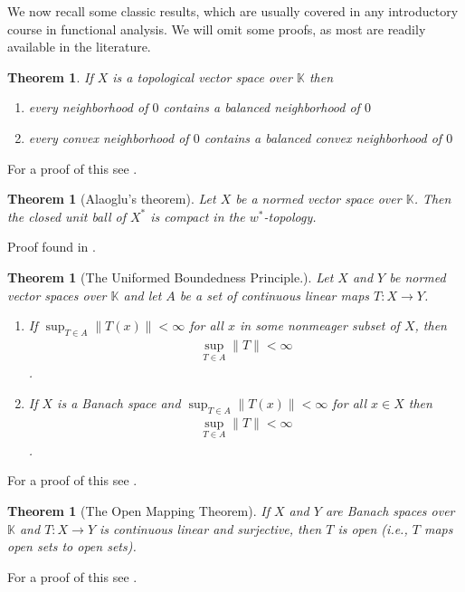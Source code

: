 \documentclass[10pt,twoside,openany,final]{memoir}
\theoremstyle{break}
\newtheorem{theorem}[section]{Theorem}
\theoremstyle{Break}
\newcommand{\lv}{\lVert}
\newcommand{\rv}{\rVert}
\begin{document}
\noindent We now recall some classic results, which are usually covered in any introductory course in functional analysis. We will omit some proofs, as most are readily available in the literature.
\begin{theorem}\label{balanced neigh}
If $X$ is a topological vector space over $\mathbb{K}$ then
\begin{enumerate}
\item every neighborhood of $0$ contains a balanced neighborhood of $0$\\
\item every convex neighborhood of $0$ contains a balanced convex neighborhood of $0$
\end{enumerate}
\end{theorem}
For a proof of this see \cite[1.14][12]{rudin1991functional}.
\begin{theorem}[Alaoglu's theorem]\label{Alaoglu}
	Let $X$ be a normed vector space over $\mathbb{K}$. Then the closed unit ball of $X^*$ is compact in the $w^*$-topology. 
\end{theorem}
\noindent Proof found in \cite[][169]{folland2013real}.

\begin{theorem}[The Uniformed Boundedness Principle.] \label{UBP}
Let $X$ and $Y$ be normed vector spaces over $\mathbb{K}$ and let $A$ be a set of continuous linear maps $T\colon X \to Y$. 
\begin{enumerate}
\item If $\sup_{T \in A} \lv T(x) \rv < \infty$ for all $x$ in some nonmeager subset of $X$, then 
\begin{align*}
\sup_{T \in A} \lv T \rv < \infty
\end{align*}.
\item If $X$ is a Banach space and $\sup_{T \in A} \lv T(x) \rv < \infty$ for all $x \in X$ then 
\begin{align*}
\sup_{T \in A} \lv T \rv < \infty
\end{align*}.
\end{enumerate}
\end{theorem}
\noindent For a proof of this see \cite[163]{folland2013real}.

\begin{theorem}[The Open Mapping Theorem] \label{OMPT}
If $X$ and $Y$ are Banach spaces over $\mathbb{K}$ and $T \colon X \to Y$ is continuous linear and surjective, then $T$ is open (i.e., $T$ maps open sets to open sets).
\end{theorem}
\noindent For a proof of this see \cite[5.10][162]{folland2013real}.
\end{document}
